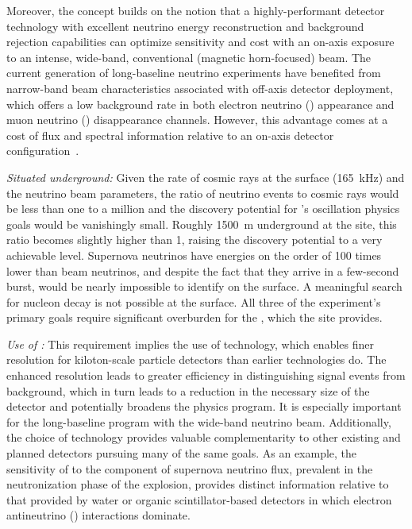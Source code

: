 Moreover, the  concept
    builds on the notion that a highly-performant detector technology  
    with excellent neutrino energy reconstruction
    and background rejection capabilities can
    optimize sensitivity and cost with an on-axis exposure to
    an intense, wide-band, conventional (magnetic horn-focused) beam.
   The current generation of long-baseline neutrino experiments
	have benefited from narrow-band beam characteristics 
	associated with off-axis detector deployment, which offers 
	a low background rate in both electron neutrino (\nue) appearance 
	and muon neutrino (\numu) disappearance channels. 
	However, this advantage comes at a cost of flux and 
	spectral information relative to an on-axis detector 
    configuration~\cite{Adams:2013qkq,Agarwalla:2014tca}.
    

\textit{Situated underground:}
Given the rate of cosmic rays at the surface (\SI{165}{kHz}) and the neutrino beam parameters, the ratio of neutrino events to cosmic rays would be less than one to a million and the discovery potential for 's oscillation physics goals would be vanishingly small.  Roughly \SI{1500}{m} underground at the  site, this ratio becomes slightly higher than 1, raising the discovery potential to a very achievable level.  Supernova neutrinos have energies on the order of \num{100} times lower than beam neutrinos, and despite the fact that they arrive in a few-second burst, would be nearly impossible to identify on the surface. A meaningful search for nucleon decay is not possible at the surface. All three of the experiment's primary goals require significant overburden for the , which the  site provides. 

\textit{Use of :}
This requirement implies the use of  technology, which enables finer resolution for kiloton-scale particle
detectors than earlier technologies do. The enhanced resolution leads to greater efficiency in distinguishing signal events from background, which in turn leads to a reduction in the necessary size of the detector and potentially broadens the physics program.
    It is especially important for the long-baseline program with the  
    wide-band neutrino beam.
    Additionally, the choice of  technology provides 
    valuable complementarity to other 
    existing and planned detectors pursuing many
    of the same goals.  As an example,
    the sensitivity of  to the \nue component of supernova 
    neutrino flux, prevalent in the neutronization phase of the 
    explosion, provides distinct information relative to that 
    provided by water or organic scintillator-based detectors in 
    which electron antineutrino (\anue) interactions dominate. 

